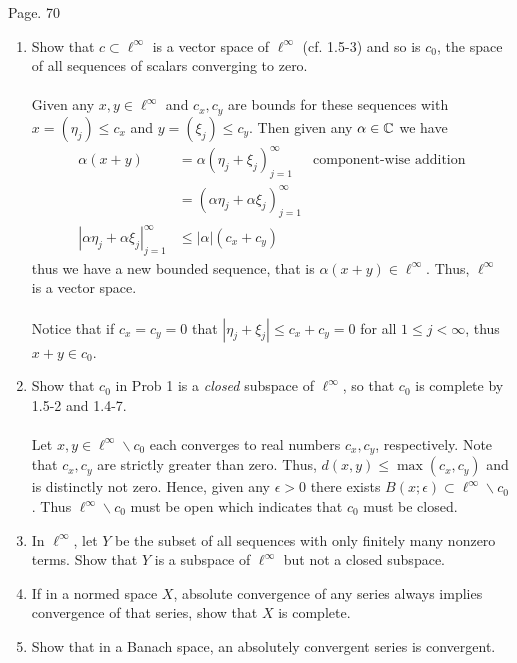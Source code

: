 \documentclass[10pt,a4paper]{report}
\begin{document}
\newpage
Page. 70 
\begin{enumerate}
	\item Show that $c \subset \ell^\infty$ is a vector space of $\ell^\infty$ (cf. 1.5-3) and so is $c_0$, the space of all sequences of scalars converging to zero.\\
	\\
	Given any $x,y \in \ell^\infty$ and $c_x, c_y$ are bounds for these sequences with $x = (\eta_j) \le c_x$ and $y=(\xi_j) \le c_y$.  Then given any $\alpha \in \mathbb{C}$ we have
	\begin{align*}
		\alpha(x + y) &= \alpha(\eta_j + \xi_j)_{j=1}^\infty & \text{component-wise addition} \\
		&= (\alpha\eta_j + \alpha\xi_j)_{j=1}^\infty \\
		|\alpha\eta_j + \alpha\xi_j|_{j=1}^\infty &\le |\alpha|(c_x + c_y)
	\end{align*}thus we have a new bounded sequence, that is $\alpha(x+y) \in \ell^\infty$.  Thus, $\ell^\infty$ is a vector space.\\ \\
	Notice that if $c_x = c_y = 0$ that $|\eta_j + \xi_j| \le c_x+c_y = 0$ for all $1 \le j < \infty$, thus $x+y \in c_0$.\\
	
	\item Show that $c_0$ in Prob 1 is a \textit{closed} subspace of $\ell^\infty$, so that $c_0$ is complete by 1.5-2 and 1.4-7. \\
	\\
	Let $x,y \in \ell^\infty \backslash c_0$ each converges to real numbers $c_x, c_y$, respectively.  Note that $c_x,c_y$ are strictly greater than zero.  Thus, $d(x,y) \le \max(c_x, c_y)$ and is distinctly not zero.  Hence, given any $\epsilon> 0$ there exists $B(x;\epsilon) \subset \ell^\infty\backslash c_0$.  Thus  $\ell^\infty\backslash c_0$ must be open which indicates that $c_0$ must be closed.\\
	
	\item In $\ell^\infty$, let $Y$ be the subset of all sequences with only finitely many nonzero terms.  Show that $Y$ is a subspace of $\ell^\infty$ but not a closed subspace. 
	
	\setcounter{enumi}{7}
	\item If in a normed space $X$, absolute convergence of any series always implies convergence of that series, show that $X$ is complete.
	
	\item Show that in a Banach space, an absolutely convergent series is convergent.
	

\end{enumerate}
\end{document}

